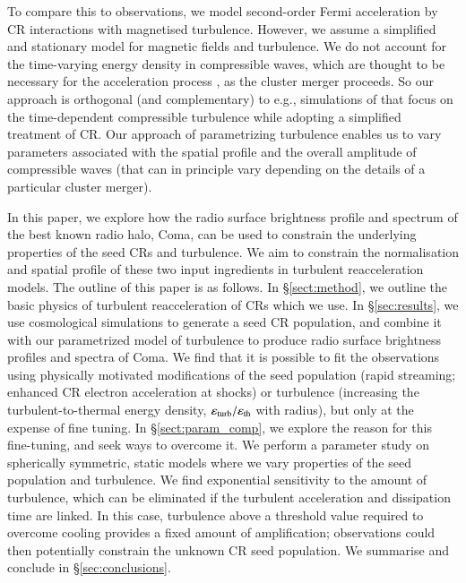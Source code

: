 \documentclass[fleqn,usenatbib,useAMS]{mnras}
\newcommand{\eps}{\varepsilon}
\begin{document}
To compare this to observations, we model second-order Fermi acceleration by CR
interactions with magnetised turbulence. However, we assume a simplified and
stationary model for magnetic fields and turbulence. We do not account for the
time-varying energy density in compressible waves, which are thought to be
necessary for the acceleration process \citep{brunetti07,brunetti11}, as the
cluster merger proceeds.  So our approach is orthogonal (and complementary) to
e.g., simulations of \citealp{miniati15} that focus on the time-dependent
compressible turbulence while adopting a simplified treatment of CR. Our
approach of parametrizing turbulence enables us to vary parameters associated
with the spatial profile and the overall amplitude of compressible waves (that
can in principle vary depending on the details of a particular cluster merger).

In this paper, we explore how the radio surface brightness profile and spectrum
of the best known radio halo, Coma, can be used to constrain the underlying
properties of the seed CRs and turbulence. We aim to constrain the normalisation
and spatial profile of these two input ingredients in turbulent reacceleration
models. The outline of this paper is as follows. In \S\ref{sect:method}, we
outline the basic physics of turbulent reacceleration of CRs which we use. In
\S\ref{sec:results}, we use cosmological simulations to generate a seed CR
population, and combine it with our parametrized model of turbulence to produce
radio surface brightness profiles and spectra of Coma. We find that it is
possible to fit the observations using physically motivated modifications of the
seed population (rapid streaming; enhanced CR electron acceleration at shocks)
or turbulence (increasing the turbulent-to-thermal energy density, $\eps_{\rm
  turb}/\eps_{\rm th}$ with radius), but only at the expense of fine
tuning. In \S\ref{sect:param_comp}, we explore the reason for this fine-tuning,
and seek ways to overcome it. We perform a parameter study on spherically
symmetric, static models where we vary properties of the seed population and
turbulence. We find exponential sensitivity to the amount of turbulence, which
can be eliminated if the turbulent acceleration and dissipation time are
linked. In this case, turbulence above a threshold value required to overcome
cooling provides a fixed amount of amplification; observations could then
potentially constrain the unknown CR seed population. We summarise and conclude
in \S\ref{sec:conclusions}.


\end{document}
